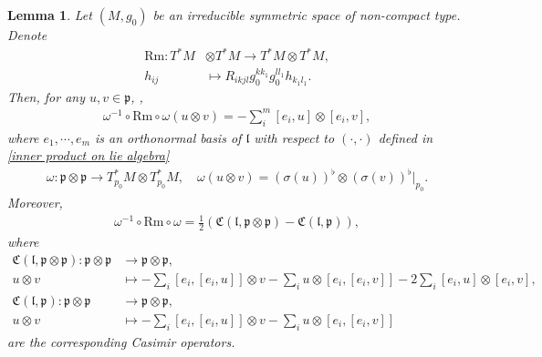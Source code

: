 \documentclass[12pt]{amsart}
\newtheorem{lemma}{Lemma}[section]
\begin{document}
\begin{lemma}\label{curvature representation lemma}
Let $(M, g_0)$ be an irreducible symmetric space of non-compact type. Denote
\begin{align*}
    \mathrm{Rm}: T^{*}M &\otimes T^*M \rightarrow T^*M\otimes T^*M,\\
    h_{ij} &\mapsto R_{ikjl} g_0^{kk_1} g_0^{ll_1} h_{k_1l_1}.
\end{align*}
Then, for any $u, v \in \mathfrak{p}$, ,
\begin{align}\label{curvature representation 1}
    \omega^{-1}\circ\mathrm{Rm} \circ \omega (u\otimes v) = -\sum_{i}^{m} [e_i, u] \otimes [e_i, v],  
\end{align}
where $e_1, \cdots, e_m$ is an orthonormal basis of $\mathfrak{l}$ with respect to  $( \cdot , \cdot )$ defined in \eqref{inner product on lie algebra}
\begin{align}
    \omega: \mathfrak{p}\otimes \mathfrak{p} \rightarrow T^*_{p_0}M \otimes T^*_{p_0}M, \quad \omega (u\otimes v) = (\sigma(u))^{\flat}\otimes (\sigma(v))^{\flat}\Big|_{p_0}.
\end{align}
Moreover, 
\begin{align}\label{curvature representation}
    \omega^{-1}\circ\mathrm{Rm}\circ \omega = \frac{1}{2}(\mathfrak{C}(\mathfrak{l}, \mathfrak{p}\otimes\mathfrak{p}) - \mathfrak{C}(\mathfrak{l}, \mathfrak{p})),
\end{align}
where 
\begin{align*}
    \mathfrak{C}(\mathfrak{l}, \mathfrak{p}\otimes \mathfrak{p}) : \mathfrak{p} \otimes \mathfrak{p} &\rightarrow \mathfrak{p} \otimes \mathfrak{p},\\
u\otimes v &\mapsto -\sum_{i} [e_i, [e_i, u]] \otimes v - \sum_{i}u \otimes [e_i, [e_i, v]] - 2\sum_{i}[e_i, u]\otimes [e_i, v], \\
    \mathfrak{C}(\mathfrak{l}, \mathfrak{p}): \mathfrak{p} \otimes \mathfrak{p} &\rightarrow \mathfrak{p} \otimes \mathfrak{p}, \\
    u\otimes v &\mapsto -\sum_{i} [e_i, [e_i, u]] \otimes v - \sum_{i}u \otimes [e_i, [e_i, v]] 
\end{align*}
are the corresponding Casimir operators.
\end{lemma}
\end{document}
